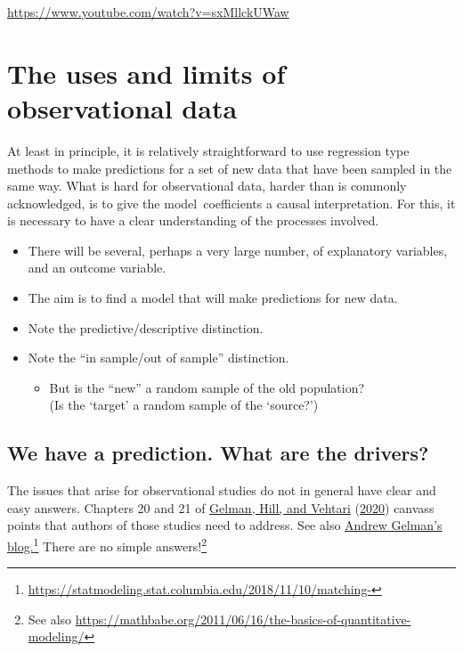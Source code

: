 \documentclass[
  10pt,
  b5paper]{book}
\providecommand{\tightlist}{%
  \setlength{\itemsep}{0pt}\setlength{\parskip}{0pt}}
\begin{document}
\url{https://www.youtube.com/watch?v=sxMllckUWaw}

\hypertarget{the-uses-and-limits-of-observational-data}{%
\chapter{The uses and limits of observational data}\label{the-uses-and-limits-of-observational-data}}

At least in principle, it is relatively straightforward to use
regression type methods to make predictions for a set of new
data that have been sampled in the same way. What is hard for
observational data, harder than is commonly acknowledged,
is to give the model~coefficients a causal interpretation.
For this, it is necessary to have a clear understanding of the
processes involved.

\begin{itemize}
\tightlist
\item
  There will be several, perhaps a very large number,
  of explanatory variables, and an outcome variable.
\item
  The aim is to find a model that will make predictions for new data.
\item
  Note the predictive/descriptive distinction.\\
\item
  Note the ``in sample/out of sample'' distinction.

  \begin{itemize}
  \tightlist
  \item
    But is the ``new'' a random sample of the old population?\\
    (Is the `target' a random sample of the `source?')
  \end{itemize}
\end{itemize}

\hypertarget{we-have-a-prediction.-what-are-the-drivers}{%
\section{We have a prediction. What are the drivers?}\label{we-have-a-prediction.-what-are-the-drivers}}

The issues that arise for observational studies do not in general have
clear and easy answers. Chapters 20 and 21 of \protect\hyperlink{ref-gelman2020regression}{Gelman, Hill, and Vehtari} (\protect\hyperlink{ref-gelman2020regression}{2020})
canvass points that authors of those studies need to address. See also
\href{https://statmodeling.stat.columbia.edu/2018/11/10/matching-discarding-non-matches-deal-lack-complete-overlap-regression-adjust-imbalance-treatment-control-groups/}{Andrew Gelman's blog.}\footnote{\url{https://statmodeling.stat.columbia.edu/2018/11/10/matching-}} There are no simple
answers!\footnote{See also \url{https://mathbabe.org/2011/06/16/the-basics-of-quantitative-modeling/}}
\end{document}
